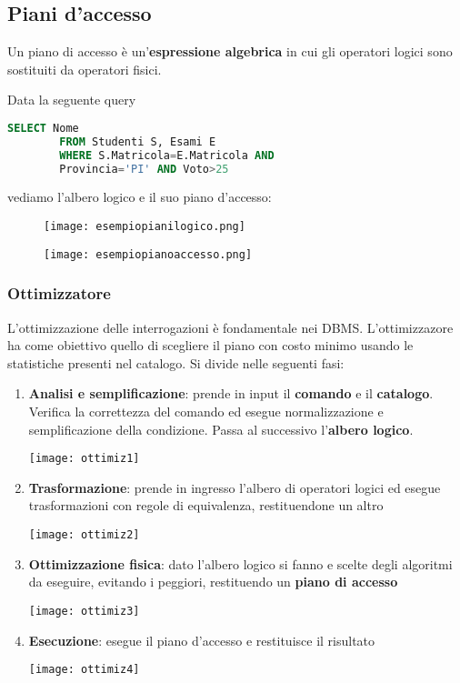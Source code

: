 \subsection{Piani d'accesso}
Un piano di accesso è un’\textbf{espressione algebrica} in cui gli operatori logici sono sostituiti da operatori fisici.

\begin{example}
	Data la seguente query
	\begin{lstlisting}[language=SQL]
		SELECT Nome
		FROM Studenti S, Esami E
		WHERE S.Matricola=E.Matricola AND
		Provincia='PI' AND Voto>25
	\end{lstlisting}
	vediamo l'albero logico e il suo piano d'accesso:
	\begin{figure}[!h]
		\centering
		\begin{minipage}{.45\textwidth}
			\centering
			\texttt{[image: esempiopianilogico.png]}
		\end{minipage}
		\begin{minipage}{.45\textwidth}
			\centering
			\texttt{[image: esempiopianoaccesso.png]}
		\end{minipage}
	\end{figure}
\end{example}
\subsubsection{Ottimizzatore}
L'ottimizzazione delle interrogazioni è fondamentale nei DBMS. L'ottimizzazore ha come obiettivo quello di scegliere il piano con costo minimo usando le statistiche presenti nel catalogo. Si divide nelle seguenti fasi:
\begin{enumerate}
	\item \textbf{Analisi e semplificazione}: prende in input il \textbf{comando} e il \textbf{catalogo}. Verifica la correttezza del comando ed esegue normalizzazione e semplificazione della condizione. Passa al successivo l'\textbf{albero logico}.
	\begin{center}
		\texttt{[image: ottimiz1]}
	\end{center}
	\item \textbf{Trasformazione}: prende in ingresso l'albero di operatori logici ed esegue trasformazioni con regole di equivalenza, restituendone un altro
	\begin{center}
		\texttt{[image: ottimiz2]}
	\end{center}
	\item \textbf{Ottimizzazione fisica}: dato l'albero logico si fanno e scelte degli algoritmi da eseguire, evitando i peggiori, restituendo un \textbf{piano di accesso}
	\begin{center}
		\texttt{[image: ottimiz3]}
	\end{center}
	\item \textbf{Esecuzione}: esegue il piano d'accesso e restituisce il risultato
	\begin{center}
		\texttt{[image: ottimiz4]}
	\end{center}
\end{enumerate}
